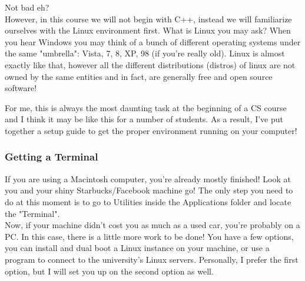 Not bad eh?\\

However, in this course we will not begin with C++, instead we will familiarize ourselves with the Linux environment first.  What is Linux you may ask?  When you hear Windows you may think of a bunch of different operating systems under the same "umbrella": Vista, 7, 8, XP, 98 (if you're really old).  Linux is almost exactly like that, however all the different distributions (distros) of linux are not owned by the same entities and in fact, are generally free and open source software!





For me, this is always the most daunting task at the beginning of a CS course and I think it may be like this for a number of students.  As a result, I've put together a setup guide to get the proper environment running on your computer!\\

\subsubsection*{Getting a Terminal}
If you are using a Macintosh computer, you're already mostly finished!  Look at you and your shiny Starbucks/Facebook machine go!  The only step you need to do at this moment is to go to Utilities inside the Applications folder and locate the "Terminal".\\

Now, if your machine didn't cost you as much as a used car, you're probably on a PC.  In this case, there is a little more work to be done!  You have a few options, you can install and dual boot a Linux instance on your machine, or use a program to connect to the university's Linux servers.  Personally, I prefer the first option, but I will set you up on the second option as well.\\

